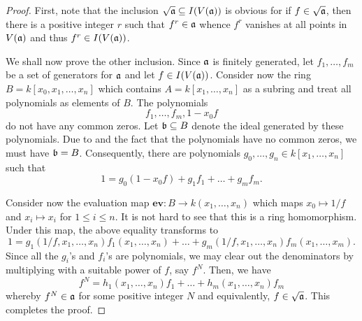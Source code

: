 \begin{proof}
    First, note that the inclusion $\sqrt{\mathfrak a}\subseteq I(V(\mathfrak a))$ is obvious for if $f\in\sqrt{\mathfrak a}$, then there is a positive integer $r$ such that $f^r\in\mathfrak a$ whence $f^r$ vanishes at all points in $V(\mathfrak a)$ and thus $f^r\in I(V(\mathfrak a))$.

    We shall now prove the other inclusion. Since $\mathfrak a$ is finitely generated, let $f_1,\dots,f_m$ be a set of generators for $\mathfrak a$ and let $f\in I(V(\mathfrak a))$. Consider now the ring $B = k[x_0,x_1,\dots,x_n]$ which contains $A = k[x_1,\dots,x_n]$ as a subring and treat all polynomials as elements of $B$. The polynomials
    \begin{equation*}
        f_1,\dots,f_m, 1 - x_0f
    \end{equation*}
    do not have any common zeros. Let $\mathfrak b\subseteq B$ denote the ideal generated by these polynomials. Due to  and the fact that the polynomials have no common zeros, we must have $\mathfrak b = B$. Consequently, there are polynomials $g_0,\dots,g_n\in k[x_1,\dots,x_n]$ such that 
    \begin{equation*}
        1 = g_0(1 - x_0f) + g_1f_1 + \dots + g_mf_m.
    \end{equation*}

    Consider now the evaluation map $\mathbf{ev}: B\to k(x_1,\dots,x_n)$ which maps $x_0\mapsto 1/f$ and $x_i\mapsto x_i$ for $1\le i\le n$. It is not hard to see that this is a ring homomorphism. Under this map, the above equality transforms to 
    \begin{equation*}
        1 = g_1(1/f,x_1,\dots,x_n)f_1(x_1,\dots,x_n) + \dots + g_m(1/f,x_1,\dots,x_n)f_m(x_1,\dots,x_m).
    \end{equation*}
    Since all the $g_i$'s and $f_i$'s are polynomials, we may clear out the denominators by multiplying with a suitable power of $f$, say $f^N$. Then, we have 
    \begin{equation*}
        f^N = h_1(x_1,\dots,x_n)f_1 + \dots + h_m(x_1,\dots,x_n)f_m
    \end{equation*}
    whereby $f^N\in\mathfrak a$ for some positive integer $N$ and equivalently, $f\in\sqrt{\mathfrak a}$. This completes the proof.
\end{proof}

\hrulefill 

